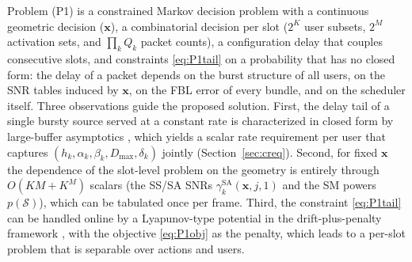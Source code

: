 \documentclass[journal]{IEEEtran}
\newcommand{\Dmax}{D_{\max}}
\newcommand{\vect}[1]{\bm{#1}}
\newcommand{\Sset}{\mathcal{S}}
\begin{document}
Problem (P1) is a constrained Markov decision problem with a continuous geometric decision ($\vect x$), a combinatorial decision per slot ($2^K$ user subsets, $2^M$ activation sets, and $\prod_k Q_k$ packet counts), a configuration delay that couples consecutive slots, and constraints \eqref{eq:P1tail} on a probability that has no closed form: the delay of a packet depends on the burst structure of all users, on the SNR tables induced by $\vect x$, on the FBL error of every bundle, and on the scheduler itself. Three observations guide the proposed solution. First, the delay tail of a single bursty source served at a constant rate is characterized in closed form by large-buffer asymptotics \cite{Anick1982,Chang1994}, which yields a scalar rate requirement per user that captures $(h_k,\alpha_k,\beta_k,\Dmax,\delta_k)$ jointly (Section~\ref{sec:creq}). Second, for fixed $\vect x$ the dependence of the slot-level problem on the geometry is entirely through $O(KM+K^M)$ scalars (the SS/SA SNRs $\gamma_k^{\mathrm{SA}}(\vect x,j,1)$ and the SM powers $p(\Sset)$), which can be tabulated once per frame. Third, the constraint \eqref{eq:P1tail} can be handled online by a Lyapunov-type potential in the drift-plus-penalty framework \cite{Neely2010}, with the objective \eqref{eq:P1obj} as the penalty, which leads to a per-slot problem that is separable over actions and users.

\end{document}
